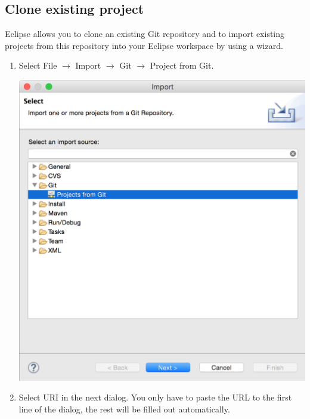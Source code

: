 \documentclass{article}
\begin{document}
\subsection{Clone existing project}

Eclipse allows you to clone an existing Git repository and to import
existing projects from this repository into your Eclipse workspace by
using a wizard.

\begin{enumerate}

\item Select File $\rightarrow$ Import $\rightarrow$ Git $\rightarrow$ Project from Git.

\begin{center}
\includegraphics[scale=0.35]{figures/s13.png}
\end{center}

\item Select URI in the next dialog. You only have to paste the URL to the first line of the dialog, the rest will be filled out automatically.


\end{enumerate}
\end{document}
